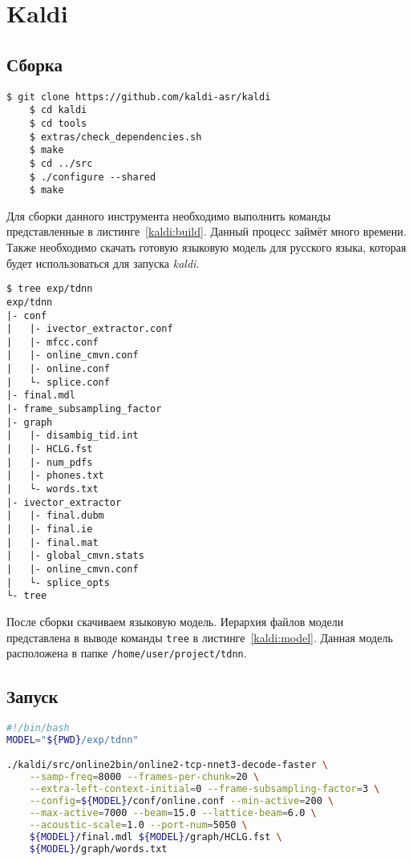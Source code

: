 \section{Kaldi}
\subsection{Сборка}
\begin{lstlisting}[caption={Сборка Kaldi}, label=kaldi:build]
    $ git clone https://github.com/kaldi-asr/kaldi
    $ cd kaldi
    $ cd tools
    $ extras/check_dependencies.sh
    $ make
    $ cd ../src
    $ ./configure --shared
    $ make
\end{lstlisting}

Для сборки данного инструмента необходимо выполнить команды
представленные в листинге~\ref{kaldi:build}. Данный процесс займёт много времени.
Также необходимо скачать готовую языковую модель для русского языка, которая
будет использоваться для запуска \textit{kaldi}.

\begin{minipage}{\textwidth}

\begin{lstlisting}[caption={Структура языковой модели}, label={kaldi:model}]
$ tree exp/tdnn
exp/tdnn
|- conf
|   |- ivector_extractor.conf
|   |- mfcc.conf
|   |- online_cmvn.conf
|   |- online.conf
|   └- splice.conf
|- final.mdl
|- frame_subsampling_factor
|- graph
|   |- disambig_tid.int
|   |- HCLG.fst
|   |- num_pdfs
|   |- phones.txt
|   └- words.txt
|- ivector_extractor
|   |- final.dubm
|   |- final.ie
|   |- final.mat
|   |- global_cmvn.stats
|   |- online_cmvn.conf
|   └- splice_opts
└- tree
\end{lstlisting}
\end{minipage}


После сборки скачиваем языковую модель. Иерархия файлов модели представлена
в выводе команды \texttt{tree} в листинге~\ref{kaldi:model}. Данная модель
расположена в папке \texttt{/home/user/project/tdnn}.

\subsection{Запуск}
\begin{lstlisting}[caption={Запуск tcp-сервера},label={kaldi:run},language=bash]
#!/bin/bash
MODEL="${PWD}/exp/tdnn"

./kaldi/src/online2bin/online2-tcp-nnet3-decode-faster \
    --samp-freq=8000 --frames-per-chunk=20 \
    --extra-left-context-initial=0 --frame-subsampling-factor=3 \
    --config=${MODEL}/conf/online.conf --min-active=200 \
    --max-active=7000 --beam=15.0 --lattice-beam=6.0 \
    --acoustic-scale=1.0 --port-num=5050 \
    ${MODEL}/final.mdl ${MODEL}/graph/HCLG.fst \
    ${MODEL}/graph/words.txt
\end{lstlisting}

